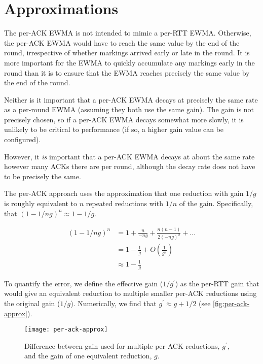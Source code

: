 \section{Approximations}\label{prresp_approx}

\balance
The per-ACK EWMA is not intended to mimic a per-RTT EWMA. Otherwise, the per-ACK
EWMA would have to reach the same value by the end of the round, irrespective of
whether markings arrived early or late in the round.
It is more important for the EWMA to quickly accumulate any markings early in
the round than it is to ensure that the EWMA reaches precisely the same value by
the end of the round. 

Neither is it important that a per-ACK EWMA decays at precisely the same rate as
a per-round EWMA (assuming they both use the same gain). The gain is not
precisely chosen, so if a per-ACK EWMA decays somewhat more slowly, it is
unlikely to be critical to performance (if so, a higher gain value can be
configured).

However, it \emph{is} important that a per-ACK EWMA decays at about the same
rate however many ACKs there are per round, although the decay rate does not
have to be precisely the same.

The per-ACK approach uses the approximation that one reduction with gain \(1/g\)
is roughly equivalent to \(n\) repeated reductions with \(1/n\) of the gain.
Specifically, that \((1 - 1/ng)^n \approx 1 - 1/g\).

\begin{align*}
(1 - 1/ng)^n &=       1 + \frac{n}{-ng} + \frac{n(n-1)}{2(-ng)^2} + \ldots \\
             &=       1 - \frac{1}{g} + O\left(\frac{1}{g^2}\right)\\
             &\approx 1 - \frac{1}{g}
\end{align*}

To quantify the error, we define the effective gain
(\(1/g^\prime\)) as the per-RTT gain that would give an equivalent reduction to
multiple smaller per-ACK reductions using the original gain (\(1/g\)).
Numerically, we find that \(g^\prime \approx g + 1/2\) (see \autoref{fig:per-ack-approx}).

\begin{figure}[h]
	\texttt{[image: per-ack-approx]}
	\caption{Difference between gain used for multiple per-ACK reductions, \(g^\prime\), and the gain of one equivalent reduction, \(g\).}
	\label{fig:per-ack-approx}
\end{figure}

